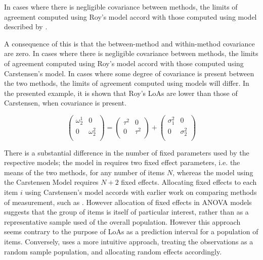 \documentclass[12pt, a4paper]{report}
\theoremstyle{plain}
\theoremstyle{definition}
\theoremstyle{remark}
\begin{document}
	
	
	
	
	
	
	
	In cases where there is negligible covariance between methods, the limits of agreement computed using Roy's model accord with those computed using model described by \citet{BXC2008}. 
	
	
	
	A consequence of this is that the between-method and within-method covariance are zero. In cases where there is negligible covariance between methods, the limits of agreement computed using Roy's model accord with those computed using Carstensen's model. In cases where some degree of covariance is present between the two methods, the limits of agreement computed using models will differ. In the presented example, it is shown that Roy's LoAs are lower than those of Carstensen, when covariance is present. 
	
	\[\left(\begin{array}{cc}
	\omega^1_2  & 0 \\
	0 & \omega^2_2 \\
	\end{array}  \right)
	=  \left(
	\begin{array}{cc}
	\tau^2  & 0 \\
	0 & \tau^2 \\
	\end{array} \right)+
	\left(
	\begin{array}{cc}
	\sigma^2_1  & 0 \\
	0 & \sigma^2_2 \\
	\end{array}\right)
	\]
	
There is a substantial difference in the number of fixed parameters used by the respective models; the model in \citet{ARoy2009} requires two fixed effect parameters, i.e. the means of the two methods, for any number of items $N$, whereas the model using the Carstensen Model requires $N+2$ fixed effects. Allocating fixed effects to each item $i$ using Carstensen's model accords with earlier work on comparing methods of measurement, such as \citet{Grubbs48}. However allocation of fixed effects in ANOVA models suggests that the group of items is itself of particular interest, rather than as a representative sample used of the overall population. However this approach seems contrary to the purpose of LoAs as a prediction interval for a population of items. Conversely, \citet{ARoy2009}
	uses a more intuitive approach, treating the observations as a random sample population, and allocating random effects accordingly.
	
\end{document}
